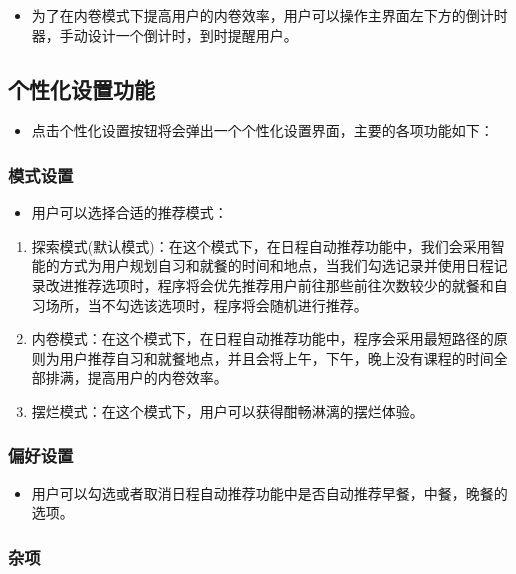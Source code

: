 \documentclass[11pt,hyperref,a4paper,UTF8]{ctexart}
\begin{document}
\begin{CJK}{UTF8}{gkai}
\begin{itemize}
    \item 为了在内卷模式下提高用户的内卷效率，用户可以操作主界面左下方的倒计时器，手动设计一个倒计时，到时提醒用户。
\end{itemize}


\subsection{个性化设置功能}
\begin{itemize}
    \item 点击个性化设置按钮将会弹出一个个性化设置界面，主要的各项功能如下：
\end{itemize}

\subsubsection{模式设置}
\begin{itemize}
    \item 用户可以选择合适的推荐模式：
\end{itemize}

\begin{enumerate}
    \item 探索模式(默认模式)：在这个模式下，在日程自动推荐功能中，我们会采用智能的方式为用户规划自习和就餐的时间和地点，当我们勾选记录并使用日程记录改进推荐选项时，程序将会优先推荐用户前往那些前往次数较少的就餐和自习场所，当不勾选该选项时，程序将会随机进行推荐。
    \item 内卷模式：在这个模式下，在日程自动推荐功能中，程序会采用最短路径的原则为用户推荐自习和就餐地点，并且会将上午，下午，晚上没有课程的时间全部排满，提高用户的内卷效率。
    \item 摆烂模式：在这个模式下，用户可以获得酣畅淋漓的摆烂体验。
\end{enumerate}

\subsubsection{偏好设置}
\begin{itemize}
    \item 用户可以勾选或者取消日程自动推荐功能中是否自动推荐早餐，中餐，晚餐的选项。
\end{itemize}

\subsubsection{杂项}


\end{CJK}
\end{document}
